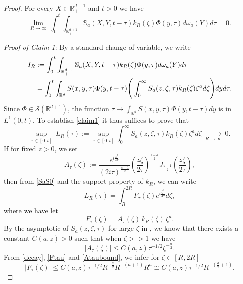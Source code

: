 \documentclass[11pt,letter]{amsart}
\def \RN {\mathbb{R}_+^{d+1}}
\def \R {\mathbb{R}}
\newcommand{\Rd}{\mathbb R^d}
\numberwithin{equation}{section}
\numberwithin{equation}{section}
\begin{document}
\begin{proof}
 For every $X\in \RN$ and $t>0$ we have
\begin{equation}\label{claim1}
\underset{R\to \infty}{\lim}\ \int_0^t \int_{\RN} \mathbb S_a(X,Y,t-\tau) k_R(\zeta) \Phi(y,\tau) d\omega_a(Y) d\tau = 0.
\end{equation}

\noindent \emph{Proof of Claim 1}:
By a standard change of variable, we write 
\begin{align}\label{I_R}
I_R & :=\int_0^t \int_{\RN} \mathbb S_a(X,Y,t-\tau) k_R(\zeta) \Phi(y,\tau) d\omega_a(Y) d\tau
\\
& = \int_0^t\int_{\Rd}
S(x,y,\tau) \Phi(y,t-\tau)
\Bigg(\int_0^\infty S_a(z,\zeta,\tau) k_R(\zeta) \zeta^a d\zeta\Bigg)
dy d\tau.
\notag
\end{align}
Since $\Phi\in \mathscr S(\R^{d+1})$, the function $\tau\to \int_{\Rd}
S(x,y,\tau) \Phi(y,t-\tau) dy$ is in $L^1(0,t)$. To establish \eqref{claim1} it thus suffices to prove that 
\begin{equation}\label{supJ}
\underset{\tau\in [0,t]}{\sup}\ L_R(\tau) := \underset{\tau\in [0,t]}{\sup} \int_0^\infty S_a(z,\zeta,\tau) k_R(\zeta) \zeta^a d\zeta\ \underset{R\to \infty}{\longrightarrow}\ 0.
\end{equation}
If for fixed $z>0$, we set
\begin{equation}\label{Atau}
A_\tau(\zeta) := \frac{e^{i \frac{z^2}{4\tau}}}{(2i\tau)^{\frac{a+1}2}}  \left(\frac{z\zeta}{2\tau}\right)^{\frac{1-a}2}J_{\frac{a-1}2}(\frac{z\zeta}{2\tau}),
\end{equation}
then from \eqref{SaS0} and the support property of $k_R$, we can write
\begin{equation}\label{JR}
L_R(\tau)=\int_R^{2R} F_\tau(\zeta) e^{i \frac{\zeta^2}{4\tau}} d\zeta,
\end{equation}
where we have let  
\begin{equation}\label{Ftau}
F_\tau(\zeta) = A_\tau(\zeta)\,k_R(\zeta)\,\zeta^a.
\end{equation}
By the asymptotic  of $S_a(z,\zeta,\tau)$ for large $\zeta$ in \cite{GS}, we know that there exists a constant $C(a,z)>0$ such that when $\zeta>>1$ we have
\begin{equation}\label{Ataubound}
|A_\tau(\zeta)| \le C(a,z) \tau^{-1/2} \zeta^{-\frac a2}.
\end{equation}
From \eqref{decay}, \eqref{Ftau} and \eqref{Ataubound}, we infer for $\zeta\in [R,2R]$ 
\begin{equation}\label{Ftau2}
|F_\tau(\zeta)| \le C(a,z) \tau^{-1/2} R^{-\frac a2} R^{-(a+1)} R^a \cong C(a,z) \tau^{-1/2} R^{-(\frac{a}2+1)}. 

\end{equation}
\end{proof}
\end{document}
